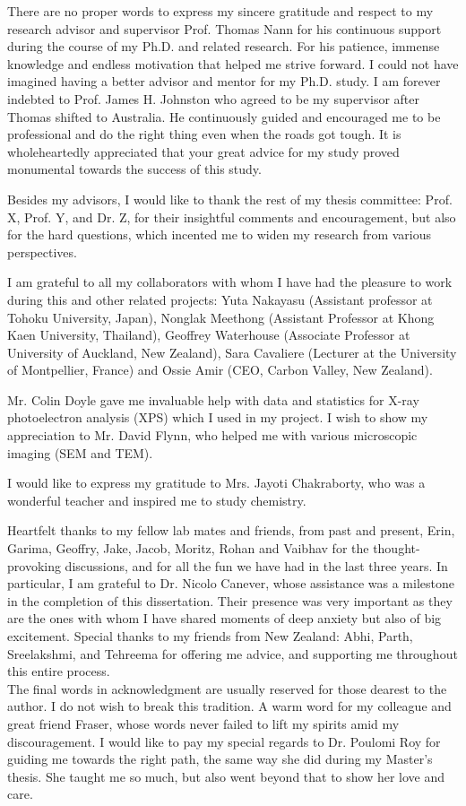 \documentclass[
11pt, %
oneside, %
english, %
onehalfspacing, %
nolistspacing, %
liststotoc, %
headsepline, %
consistentlayout, %
]{name} %
\begin{document}
\begin{acknowledgements}
\addchaptertocentry{\acknowledgementname} 
There are no proper words to express my sincere gratitude and respect to my research advisor and supervisor Prof. Thomas Nann for his continuous support during the course of my Ph.D. and related research. For his patience, immense knowledge and endless motivation that helped me strive forward. I could not have imagined having a better advisor and mentor for my Ph.D. study.
I am forever indebted to Prof. James H. Johnston who agreed to be my supervisor after Thomas shifted to Australia. He continuously guided and encouraged me to be professional and do the right thing even when the roads got tough. It is wholeheartedly appreciated that your great advice for my study proved monumental towards the success of this study. 

Besides my advisors, I would like to thank the rest of my thesis committee: Prof. X, Prof. Y, and Dr. Z, for their insightful comments and encouragement, but also for the hard questions, which incented me to widen my research from various perspectives.

I am grateful to all my collaborators with whom I have had the pleasure to work during this and other related projects: Yuta Nakayasu (Assistant professor at Tohoku University, Japan), Nonglak Meethong (Assistant Professor at Khong Kaen University, Thailand), Geoffrey Waterhouse (Associate Professor at University of Auckland, New Zealand), Sara Cavaliere (Lecturer at the University of Montpellier, France) and Ossie Amir (CEO, Carbon Valley, New Zealand).

Mr. Colin Doyle gave me invaluable help with data and statistics for X-ray photoelectron analysis (XPS) which I used in my project. I wish to show my appreciation to Mr. David Flynn, who helped me with various microscopic imaging (SEM and TEM).

I would like to express my gratitude to Mrs. Jayoti Chakraborty, who was a wonderful teacher and inspired me to study chemistry.

Heartfelt thanks to my fellow lab mates and friends, from past and present, Erin, Garima, Geoffry, Jake, Jacob, Moritz, Rohan and Vaibhav for the thought-provoking discussions, and for all the fun we have had in the last three years. In particular, I am grateful to Dr. Nicolo Canever, whose assistance was a milestone in the completion of this dissertation. Their presence was very important as they are the ones with whom I have shared moments of deep anxiety but also of big excitement. Special thanks to my friends from New Zealand: Abhi, Parth, Sreelakshmi, and Tehreema for offering me advice, and supporting me throughout this entire process. \\
The final words in acknowledgment are usually reserved for those dearest to the author. I do not wish to break this tradition. A warm word for my colleague and great friend Fraser, whose words never failed to lift my spirits amid my discouragement. I would like to pay my special regards to Dr. Poulomi Roy for guiding me towards the right path, the same way she did during my Master's thesis. She taught me so much, but also went beyond that to show her love and care. 


\end{acknowledgements}
\end{document}
